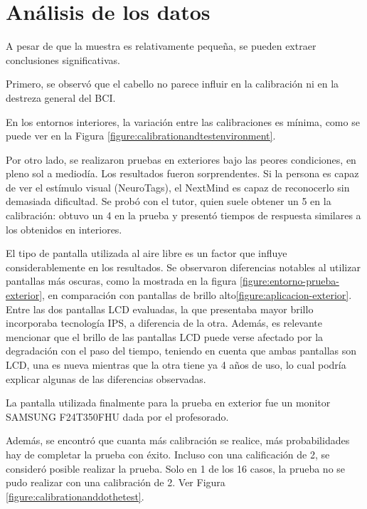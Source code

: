 \section{Análisis de los datos}
A pesar de que la muestra es relativamente pequeña, se pueden extraer conclusiones significativas.



Primero, se observó que el cabello no parece influir en la calibración ni en la destreza general del BCI.



En los entornos interiores, la variación entre las calibraciones es mínima, como se puede ver en la Figura \ref{figure:calibrationandtestenvironment}.



Por otro lado, se realizaron pruebas en exteriores bajo las peores condiciones, en pleno sol a mediodía. Los resultados fueron sorprendentes. Si la persona es capaz de ver el estímulo visual (NeuroTags), el NextMind es capaz de reconocerlo sin demasiada dificultad. Se probó con el tutor, quien suele obtener un 5 en la calibración: obtuvo un 4 en la prueba y presentó tiempos de respuesta similares a los obtenidos en interiores.



El tipo de pantalla utilizada al aire libre es un factor que influye considerablemente en los resultados. Se observaron diferencias notables al utilizar pantallas más oscuras, como la mostrada en la figura \ref{figure:entorno-prueba-exterior}, en comparación con pantallas de brillo alto\ref{figure:aplicacion-exterior}. Entre las dos pantallas LCD evaluadas, la que presentaba mayor brillo incorporaba tecnología IPS, a diferencia de la otra. Además, es relevante mencionar que el brillo de las pantallas LCD puede verse afectado por la degradación con el paso del tiempo, teniendo en cuenta que ambas pantallas son LCD, una es nueva mientras que la otra tiene ya 4 años de uso, lo cual podría explicar algunas de las diferencias observadas.



La pantalla utilizada finalmente para la prueba en exterior fue un monitor SAMSUNG F24T350FHU dada por el profesorado.



Además, se encontró que cuanta más calibración se realice, más probabilidades hay de completar la prueba con éxito. Incluso con una calificación de 2, se consideró posible realizar la prueba. Solo en 1 de los 16 casos, la prueba no se pudo realizar con una calibración de 2. Ver Figura \ref{figure:calibrationanddothetest}.



